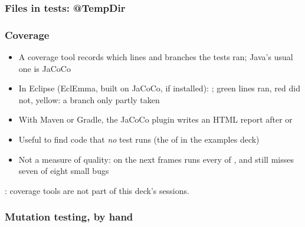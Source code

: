 \documentclass[aspectratio=169,10pt,compress]{beamer}
\begin{document}
\begin{frame}[t,fragile] \frametitle{Files in tests: @TempDir}
\end{frame}








\begin{frame}[t,fragile] \frametitle{Coverage}
	\begin{itemize}\small
		\item A coverage tool records which lines and branches the tests ran; Java's usual one is JaCoCo
		\item In Eclipse (EclEmma, built on JaCoCo, if installed): ; green lines ran, red did not,
			  yellow: a branch only partly taken
		\item With Maven or Gradle, the JaCoCo plugin writes an HTML report after  or 
		\item Useful to find code that \emph{no} test runs (the  of  in the examples deck)
		\item Not a measure of quality:  on the next frames runs every  of ,
			  and still misses seven of eight small bugs
	\end{itemize}

	\vspace{0.5em}
	\small {}: coverage tools are not part of this deck's sessions.
\end{frame}




\begin{frame}[t,fragile] \frametitle{Mutation testing, by hand}
\end{frame}
\end{document}
